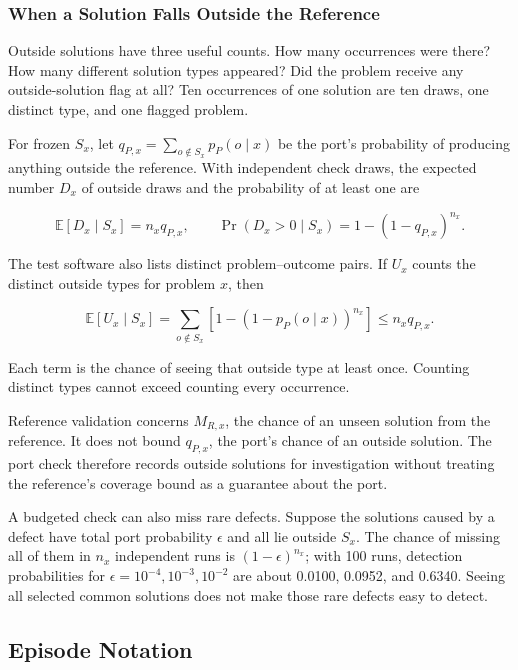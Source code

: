 \documentclass[10pt,letterpaper]{article}
\begin{document}
\subsubsection{When a Solution Falls Outside the Reference}\label{sec:novelty}

Outside solutions have three useful counts. How many occurrences were there? How many
different solution types appeared? Did the problem receive any outside-solution flag at
all? Ten occurrences of one solution are ten draws, one distinct type, and one flagged
problem.

For frozen \(S_x\), let \(q_{P,x}=\sum_{o\notin S_x}p_P(o\mid x)\) be the port's
probability of producing anything outside the reference. With independent check draws, the
expected number \(D_x\) of outside draws and the probability of at least one are

\[
\mathbb E[D_x\mid S_x]=n_xq_{P,x},\qquad
\Pr(D_x>0\mid S_x)=1-(1-q_{P,x})^{n_x}.
\]

The test software also lists distinct problem--outcome pairs. If \(U_x\) counts the
distinct outside types for problem \(x\), then

\[
\mathbb E[U_x\mid S_x]
=\sum_{o\notin S_x}\left[1-(1-p_P(o\mid x))^{n_x}\right]
\le n_xq_{P,x}.
\]

Each term is the chance of seeing that outside type at least once. Counting distinct types
cannot exceed counting every occurrence.

Reference validation concerns \(M_{R,x}\), the chance of an unseen solution from the
reference. It does not bound \(q_{P,x}\), the port's chance of an outside solution. The
port check therefore records outside solutions for investigation without treating the
reference's coverage bound as a guarantee about the port.

A budgeted check can also miss rare defects. Suppose the solutions caused by a defect have
total port probability \(\epsilon\) and all lie outside \(S_x\). The chance of missing all
of them in \(n_x\) independent runs is \((1-\epsilon)^{n_x}\); with 100 runs, detection
probabilities for \(\epsilon=10^{-4},10^{-3},10^{-2}\) are about 0.0100, 0.0952, and
0.6340. Seeing all selected common solutions does not make those rare defects easy to
detect.

\subsection{Episode Notation}\label{sec:episode-method}
\end{document}
